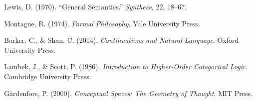 \documentclass[12pt]{article}
\theoremstyle{plain}
\theoremstyle{definition}
\begin{document}
\begin{thebibliography}{99}

Lewis, D. (1970). ``General Semantics.'' \textit{Synthese}, 22, 18--67.

Montague, R. (1974). \textit{Formal Philosophy}. Yale University Press.

Barker, C., \& Shan, C. (2014). \textit{Continuations and Natural Language}. Oxford University Press.

Lambek, J., \& Scott, P. (1986). \textit{Introduction to Higher-Order Categorical Logic}. Cambridge University Press.

G\"{a}rdenfors, P. (2000). \textit{Conceptual Spaces: The Geometry of Thought}. MIT Press.

\end{thebibliography}
\end{document}
